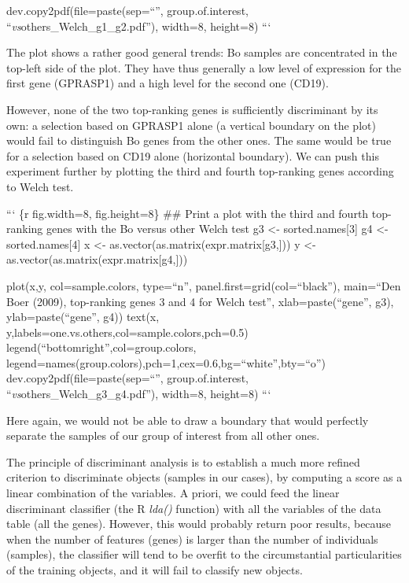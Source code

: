 dev.copy2pdf(file=paste(sep=``'', group.of.interest,
``\emph{vs}others\_Welch\_g1\_g2.pdf''), width=8, height=8) ```

The plot shows a rather good general trends: Bo samples are concentrated
in the top-left side of the plot. They have thus generally a low level
of expression for the first gene (GPRASP1) and a high level for the
second one (CD19).

However, none of the two top-ranking genes is sufficiently discriminant
by its own: a selection based on GPRASP1 alone (a vertical boundary on
the plot) would fail to distinguish Bo genes from the other ones. The
same would be true for a selection based on CD19 alone (horizontal
boundary). We can push this experiment further by plotting the third and
fourth top-ranking genes according to Welch test.

``` \{r fig.width=8, fig.height=8\} \#\# Print a plot with the third and
fourth top-ranking genes with the Bo versus other Welch test g3
\textless{}- sorted.names{[}3{]} g4 \textless{}- sorted.names{[}4{]} x
\textless{}- as.vector(as.matrix(expr.matrix{[}g3,{]})) y \textless{}-
as.vector(as.matrix(expr.matrix{[}g4,{]}))

plot(x,y, col=sample.colors, type=``n'',
panel.first=grid(col=``black''), main=``Den Boer (2009), top-ranking
genes 3 and 4 for Welch test'', xlab=paste(``gene'', g3),
ylab=paste(``gene'', g4)) text(x,
y,labels=one.vs.others,col=sample.colors,pch=0.5)
legend(``bottomright'',col=group.colors,
legend=names(group.colors),pch=1,cex=0.6,bg=``white'',bty=``o'')
dev.copy2pdf(file=paste(sep=``'', group.of.interest,
``\emph{vs}others\_Welch\_g3\_g4.pdf''), width=8, height=8) ```

Here again, we would not be able to draw a boundary that would perfectly
separate the samples of our group of interest from all other ones.

The principle of discriminant analysis is to establish a much more
refined criterion to discriminate objects (samples in our cases), by
computing a score as a linear combination of the variables. A priori, we
could feed the linear discriminant classifier (the R \emph{lda()}
function) with all the variables of the data table (all the genes).
However, this would probably return poor results, because when the
number of features (genes) is larger than the number of individuals
(samples), the classifier will tend to be overfit to the circumstantial
particularities of the training objects, and it will fail to classify
new objects.

